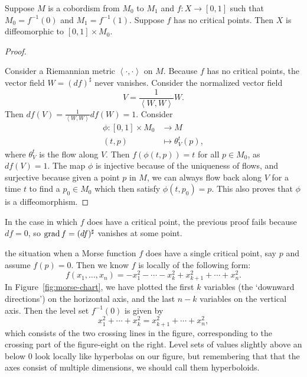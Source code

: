 \begin{prop}
    Suppose $M$ is a cobordism from $M_0$ to $ M_1$ and $f : X \to [0, 1] $ such that $M_0 = f^{-1}(0)$ and $M_1 = f^{-1}(1)$.
    Suppose $f$ has no critical points. Then $X$ is diffeomorphic to $[0, 1] \times  M_0$.
\end{prop}
\begin{proof}
    \begin{marginfigure}
        \centering
        \caption{TODO proof of cobordism without critical points}
        \label{fig:proof-of-cobordism-without-critical-points}
    \end{marginfigure}
    Consider a Riemannian metric $\left<\cdot ,\cdot  \right>$ on $M$.
    Because  $f$ has no critical points, the vector field $W = (df)^{\sharp}$ never vanishes.
    Consider the normalized vector field
    \[
    V = \frac{1}{\left<W, W \right>} W
    .\] 
    Then $df(V) = \frac{1}{\left<W, W \right>} df(W) = 1$.
    Consider
    \begin{align*}
        \phi: [0, 1] \times M_0&\longrightarrow M \\
        (t, p) &\longmapsto \theta_V^{t}(p)
    ,\end{align*}
    where $\theta_V^{t}$ is the flow along $V$.
    Then $f(\phi(t, p)) = t$ for all $p \in M_0$, as $df(V) = 1$.
    The map $\phi$ is injective because of the uniqueness of flows, and surjective because given a point $p$ in $M$, we can always flow back along $V$ for a time $t$ to find a $p_0 \in M_0$ which then satisfy $\phi(t, p_0) = p$. 
    This also proves that $\phi$ is a diffeomorphism.
\end{proof}



In the case in which $f$ does have a critical point, the previous proof fails because $df = 0$, so $\operatorname{grad} f = (df)^{\sharp}$ vanishes at some point.


 the situation when a Morse function $f$ does have a single critical point, say $p$ and assume $f(p) = 0$.
Then we know $f$ is locally of the following form:
\[
    f(x_1, \ldots, x_n) = - x_1^2 - \cdots - x_k^2 + x_{k+1}^2 + \cdots + x_n^2
.\] 
In Figure~\ref{fig:morse-chart}, we have plotted the first $k$ variables (the `downward directions') on the horizontal axis, and the last $n-k$ variables on the vertical axis.
Then the level set $f^{-1}(0)$ is given by
\[
x_1^2 + \cdots + x_k^2 = x_{k+1} ^2 + \cdots + x_n^2
,\] 
which consists of the two crossing lines in the figure, corresponding to the crossing part of the figure-eight on the right.
Level sets of values slightly above an below $0$ look locally like hyperbolas on our figure, but remembering that that the axes consist of multiple dimensions, we should call them hyperboloids.

